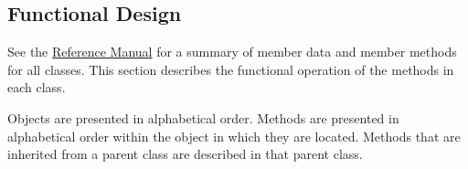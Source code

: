 %
%
%
%


\subsection{Functional Design} \label{ref:FunctionalDesign}
See the \href{file:refman.pdf}{Reference Manual}
\cite{timebib:ReferenceManual} for a summary of member data and member methods
for all classes.  This section describes the functional operation of the
methods in each class.

Objects are presented in alphabetical order.
Methods are presented in alphabetical order within the object in
which they are located.
Methods that are inherited from a parent class
are described in that parent class.

